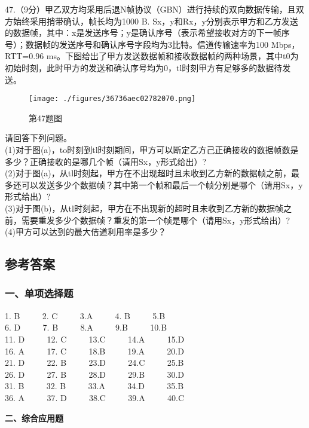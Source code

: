 47.（9分）甲乙双方均采用后退N帧协议（GBN）进行持续的双向数据传输，且双方始终采用捎带确认，帧长均为1000 B. Sx，y和Rx，y分别表示甲方和乙方发送的数据帧，其中：x是发送序号；y是确认序号（表示希望接收对方的下一帧序号）；数据帧的发送序号和确认序号字段均为3比特。信道传输速率为100 Mbps，RTT=0.96 ms。下图给出了甲方发送数据帧和接收数据帧的两种场景，其中t0为初始时刻，此时甲方的发送和确认序号均为0，tl时刻甲方有足够多的数据待发送。
\begin{figure}[ht]
\centering
\texttt{[image: ./figures/36736aec02782070.png]}
\caption{第47题图} \label{fig_CSN17_6}
\end{figure}
请回答下列问题。  \\
(1)对于图(a)，to时刻到tl时刻期间，甲方可以断定乙方己正确接收的数据帧数是多少？正确接收的是哪几个帧（请用Sx，y形式给出）? \\
(2)对于图(a)，从tl时刻起，甲方在不出现超时且未收到乙方新的数据帧之前，最多还可以发送多少个数据帧？其中第一个帧和最后一个帧分别是哪个（请用Sx，y形式给出）? \\
(3)对于图(b)，从tl时刻起，甲方在不出现新的超时且未收到乙方新的数据帧之前，需要重发多少个数据帧？重发的第一个帧是哪个（请用Sx，y形式给出）? \\
(4)甲方可以达到的最大佶道利用率是多少？


\subsection{参考答案}
\subsubsection{一、单项选择题}

1. B  $\qquad$ 2. C $\qquad$ 3.A $\qquad$ 4. B $\qquad$ 5.B \\
6. D $\qquad$ 7. B $\qquad$ 8.A $\qquad$ 9.B $\qquad$ 10.B \\
11. D $\qquad$ 12. C $\qquad$ 13.C $\qquad$ 14.A $\qquad$ 15.D \\
16. A $\qquad$ 17. C $\qquad$ 18.B $\qquad$ 19.A $\qquad$ 20.D \\
21. D $\qquad$ 22. B $\qquad$ 23.D $\qquad$ 24.C $\qquad$ 25.B \\
26. D $\qquad$ 27. B $\qquad$ 28.D $\qquad$ 29.B $\qquad$ 30.D \\
31. B $\qquad$ 32. B $\qquad$ 33.A $\qquad$ 34.D $\qquad$ 35.B \\
36. A $\qquad$ 37. D $\qquad$ 38.C $\qquad$ 39.A $\qquad$ 40.C

  \textbf{二、综合应用题}

